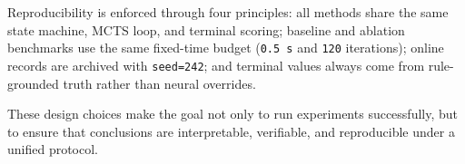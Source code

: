 Reproducibility is enforced through four principles: all methods share the same state machine, MCTS loop, and terminal scoring; baseline and ablation benchmarks use the same fixed-time budget (\texttt{0.5 s} and \texttt{120} iterations); online records are archived with \texttt{seed=242}; and terminal values always come from rule-grounded truth rather than neural overrides.

These design choices make the goal not only to run experiments successfully, but to ensure that conclusions are interpretable, verifiable, and reproducible under a unified protocol.
